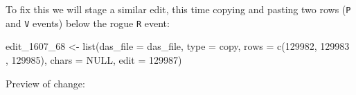\documentclass[
]{book}
\newenvironment{Shaded}{\begin{snugshade}}{\end{snugshade}}
\newcommand{\AttributeTok}[1]{\textcolor[rgb]{0.77,0.63,0.00}{#1}}
\newcommand{\ConstantTok}[1]{\textcolor[rgb]{0.00,0.00,0.00}{#1}}
\newcommand{\DecValTok}[1]{\textcolor[rgb]{0.00,0.00,0.81}{#1}}
\newcommand{\FunctionTok}[1]{\textcolor[rgb]{0.00,0.00,0.00}{#1}}
\newcommand{\NormalTok}[1]{#1}
\newcommand{\OtherTok}[1]{\textcolor[rgb]{0.56,0.35,0.01}{#1}}
\newcommand{\StringTok}[1]{\textcolor[rgb]{0.31,0.60,0.02}{#1}}
\begin{document}
To fix this we will stage a similar edit, this time copying and pasting two rows (\texttt{P} and \texttt{V} events) below the rogue \texttt{R} event:

\begin{Shaded}
\begin{Highlighting}[]
\NormalTok{edit\_1607\_68 }\OtherTok{\textless{}{-}} 
  \FunctionTok{list}\NormalTok{(}\AttributeTok{das\_file =}\NormalTok{ das\_file, }
       \AttributeTok{type =} \StringTok{\textquotesingle{}copy\textquotesingle{}}\NormalTok{,}
       \AttributeTok{rows =} \FunctionTok{c}\NormalTok{(}\DecValTok{129982}\NormalTok{, }\DecValTok{129983}\NormalTok{ , }\DecValTok{129985}\NormalTok{),}
       \AttributeTok{chars =} \ConstantTok{NULL}\NormalTok{,}
       \AttributeTok{edit =} \DecValTok{129987}\NormalTok{)}
\end{Highlighting}
\end{Shaded}

Preview of change:
\end{document}
